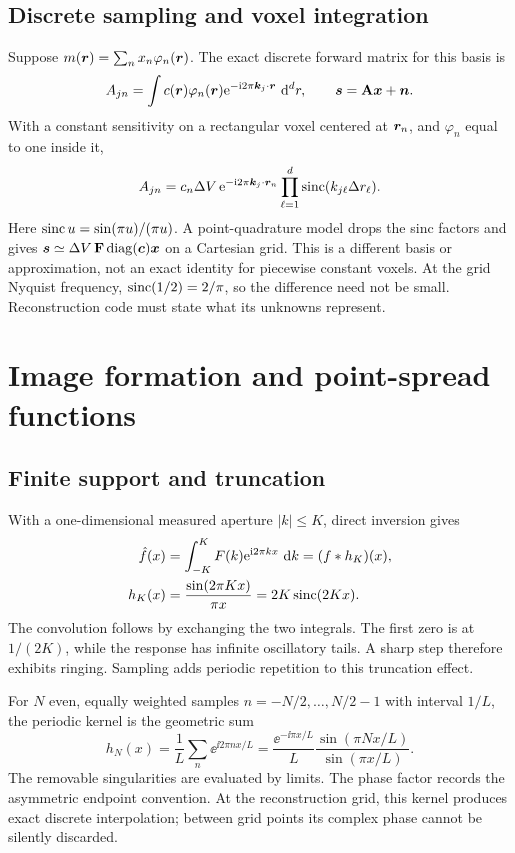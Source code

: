 \subsection{Discrete sampling and voxel integration}
Suppose \(m(\bm{r})=\sum_n x_n\varphi_n(\bm{r})\). The exact discrete forward matrix for this basis is
\begin{equation}
 A_{jn}=\int c(\bm{r})\varphi_n(\bm{r})
               \mathrm{e}^{-\mathrm{i}2\pi\bm{k}_j\cdot\bm{r}}\,\mathop{}\!\mathrm{d}^dr,
 \qquad \bm{s}=\mathbf{A}\bm{x}+\bm{n}.
 \label{eq:06:basis}
\end{equation}
With a constant sensitivity on a rectangular voxel centered at \(\bm{r}_n\), and \(\varphi_n\) equal to one inside it,
\begin{equation}
 A_{jn}=c_n\Delta V\,\mathrm{e}^{-\mathrm{i}2\pi\bm{k}_j\cdot\bm{r}_n}
          \prod_{\ell=1}^d\operatorname{sinc}(k_{j\ell}\Delta r_\ell).
 \label{eq:06:voxel}
\end{equation}
Here \(\operatorname{sinc} u=\sin(\pi u)/(\pi u)\). A point-quadrature model drops the sinc factors and gives \(\bm{s}\simeq\Delta V\,\mathbf{F}\operatorname{diag}(\bm{c})\bm{x}\) on a Cartesian grid. This is a different basis or approximation, not an exact identity for piecewise constant voxels. At the grid Nyquist frequency, \(\operatorname{sinc}(1/2)=2/\pi\), so the difference need not be small. Reconstruction code must state what its unknowns represent.

\section{Image formation and point-spread functions}
\label{sec:06:image-formation-and-point-spread-functions}
\subsection{Finite support and truncation}
With a one-dimensional measured aperture \(|k|\leq K\), direct inversion gives
\begin{align}
 \hat f(x)&=\int_{-K}^K F(k)\mathrm{e}^{\mathrm{i}2\pi kx}\,\mathop{}\!\mathrm{d} k
          =(f*h_K)(x),\\
 h_K(x)&=\frac{\sin(2\pi Kx)}{\pi x}=2K\operatorname{sinc}(2Kx).
 \label{eq:06:psf}
\end{align}
The convolution follows by exchanging the two integrals. The first zero is at \(1/(2K)\), while the response has infinite oscillatory tails. A sharp step therefore exhibits ringing. Sampling adds periodic repetition to this truncation effect.

For \(N\) even, equally weighted samples \(n=-N/2,\ldots,N/2-1\) with interval \(1/L\), the periodic kernel is the geometric sum
\begin{equation}
 h_N(x)=\frac1L\sum_n\ee^{\ii2\pi nx/L}
 =\frac{\ee^{-\ii\pi x/L}}{L}\frac{\sin(\pi Nx/L)}{\sin(\pi x/L)}.
 \label{eq:06:dirichlet}
\end{equation}
The removable singularities are evaluated by limits. The phase factor records the asymmetric endpoint convention. At the reconstruction grid, this kernel produces exact discrete interpolation; between grid points its complex phase cannot be silently discarded.

